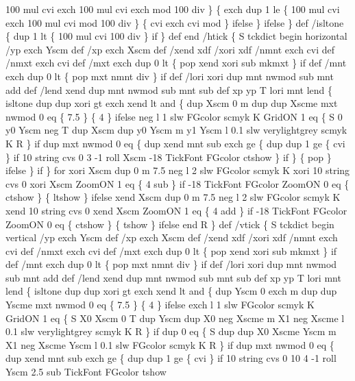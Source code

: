 \documentclass[11pt]{article}
\begin{document}
    100 mul cvi exch 100 mul cvi exch mod 100 div
    \} \{
      exch dup
      1 le \{
        100 mul cvi exch 100 mul cvi mod 100 div
        \} \{
          cvi exch cvi mod
        \} ifelse
    \} ifelse
  \} def
 /isltone \{ dup 1 lt \{ 100 mul cvi 100 div \} if \} def
end
/htick \{ 
  S tckdict begin horizontal 
    /yp exch Yscm def /xp exch Xscm def /xend xdf /xori xdf
    /nmnt exch cvi def /nmxt exch cvi def
    /mxt exch dup 0 lt \{ pop xend xori sub mkmxt \} if def
    /mnt exch dup 0 lt \{ pop mxt nmnt div \} if def
    /lori xori dup mnt nwmod sub mnt add def
    /lend xend dup mnt nwmod sub mnt sub def
    xp yp T
    lori mnt lend \{
      isltone dup dup xori gt exch xend lt and \{
        dup Xscm 0 m dup dup Xscme
        mxt nwmod 0 eq \{ 7.5 \} \{ 4 \} ifelse neg l
        1 slw FGcolor scmyk K
        GridON 1 eq \{
          S 0 y0 Yscm neg T dup Xscm dup y0 Yscm m y1 Yscm l
          0.1 slw verylightgrey scmyk K R
          \} if
        dup mxt nwmod 0 eq \{
          dup xend mnt sub exch ge \{
            dup dup 1 ge \{ cvi \} if
            10 string cvs 0 3 -1 roll Xscm -18 TickFont FGcolor ctshow
            \} if
          \} \{
            pop
          \} ifelse
        \} if
      \} for
    xori Xscm dup 0 m 7.5 neg l 2 slw FGcolor scmyk K
    xori 10 string cvs 0 xori Xscm ZoomON 1 eq \{ 4 sub \} if
    -18 TickFont FGcolor ZoomON 0 eq \{ ctshow \} \{ ltshow \} ifelse
    xend Xscm dup 0 m 7.5 neg l 2 slw FGcolor scmyk K
    xend 10 string cvs 0 xend Xscm ZoomON 1 eq \{ 4 add \} if
    -18 TickFont FGcolor ZoomON 0 eq \{ ctshow \} \{ tshow \} ifelse
  end R \} def
/vtick \{
  S tckdict begin vertical
    /yp exch Yscm def /xp exch Xscm def /xend xdf /xori xdf
    /nmnt exch cvi def /nmxt exch cvi def
    /mxt exch dup 0 lt \{ pop xend xori sub mkmxt \} if def
    /mnt exch dup 0 lt \{ pop mxt nmnt div \} if def
    /lori xori dup mnt nwmod sub mnt add def
    /lend xend dup mnt nwmod sub mnt sub def
    xp yp T
    lori mnt lend \{
      isltone dup dup xori gt exch xend lt and \{
        dup Yscm 0 exch m dup dup Yscme
        mxt nwmod 0 eq \{ 7.5 \} \{ 4 \} ifelse exch l
        1 slw FGcolor scmyk K
        GridON 1 eq \{
          S X0 Xscm 0 T dup Yscm dup X0 neg Xscme m
          X1 neg Xscme l 0.1 slw verylightgrey scmyk K R
          \} if
        dup 0 eq \{
          S dup dup X0 Xscme Yscm m X1 neg Xscme Yscm l
          0.1 slw FGcolor scmyk K R
          \} if
        dup mxt nwmod 0 eq \{
          dup xend mnt sub exch ge \{
            dup dup 1 ge \{ cvi \} if
            10 string cvs 0 10 4 -1 roll Yscm 2.5 sub TickFont FGcolor tshow
\end{document}
